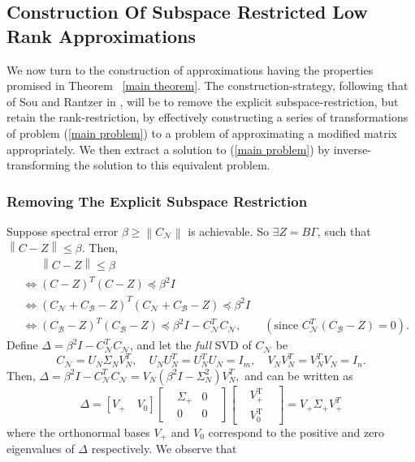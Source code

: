 \documentclass[11pt]{article}
\newcommand{\norm}[1]{\left\|#1\right\|}
\newcommand{\Leq}{\preceq}
\newcommand{\B}{\mathcal{B}}
\newcommand{\N}{\mathcal{N}}
\newcommand{\G}{\Gamma}
\newcommand{\0}{\ensuremath{\mathbf{0}}}
\renewcommand{\>}{\succ}
\newcommand{\<}{\prec}
\renewcommand{\iff}{\ensuremath{\Leftrightarrow}}
\begin{document}
\subsection{Construction Of Subspace Restricted Low Rank Approximations}
We now turn to the construction of approximations having the properties promised in Theorem~ \ref{main theorem}. The construction-strategy, following that of Sou and Rantzer in \cite{SR}, will be to remove the explicit subspace-restriction, but retain the rank-restriction, by effectively constructing a series of transformations of problem (\ref{main problem}) to a problem of approximating a modified matrix appropriately. We then extract a solution to (\ref{main problem}) by inverse-transforming the solution to this equivalent problem.

\subsubsection{Removing The Explicit Subspace Restriction}
Suppose spectral error $\beta \geq \norm{C_{\N}}$ is achievable. So
 $\exists Z = B \G$, such that $\norm{C - Z} \leq \beta$. Then,
\begin{align*}
&\phantom{\iff}\norm{C - Z} \leq \beta \\[3pt]
& \iff \left( {C} - {Z} \right)^T \left( {C} - {Z} \right) 
\Leq \beta^2 I \\
& \iff \left( {C}_{\N} + {C}_{\B} - {Z} \right)^T \left( {C}_{\N} + {C}_{\B} - {Z} \right) \Leq \beta^2 I \\
& \iff \left( {C}_{\B} - {Z} \right)^T \left( {C}_{\B} - {Z} \right) \Leq \beta^2 I - {C}_{\N} ^T {C}_{\N}, \qquad (\text{since }  {C}_{\N}^T({C}_{\B} - {Z})=0).
\end{align*}
Define 
$\Delta = \beta^2 I - {C}_{\N} ^T {C}_{\N}$, and let the \emph{full} SVD of $C_{\N}$ be 
\[ C_{\N} = U_N\Sigma_NV_N^T, \quad U_N U_N^T=U_N^TU_N=I_m, \quad V_NV_N^T = V_N^TV_N = I_n. \]
Then, $\Delta = \beta^2 I - {C}_{\N} ^T {C}_{\N} = V_N(\beta^2I - \Sigma_N^2)V_N^T,$ and can be written as
\[ \Delta =  [  V_+ \quad V_0  ]
\begin{bmatrix}
&\Sigma_+ & 0 &\\
&0 & 0&
\end{bmatrix}
\begin{bmatrix}
&V_+^{\text{T}}&\\
&V_0^{\text{T}}&
\end{bmatrix} = V_+ \Sigma_+ V_+^T \]
where the orthonormal bases $V_+$ and $V_0$ correspond to the positive and zero eigenvalues of $\Delta$ respectively. We observe that
\end{document}
